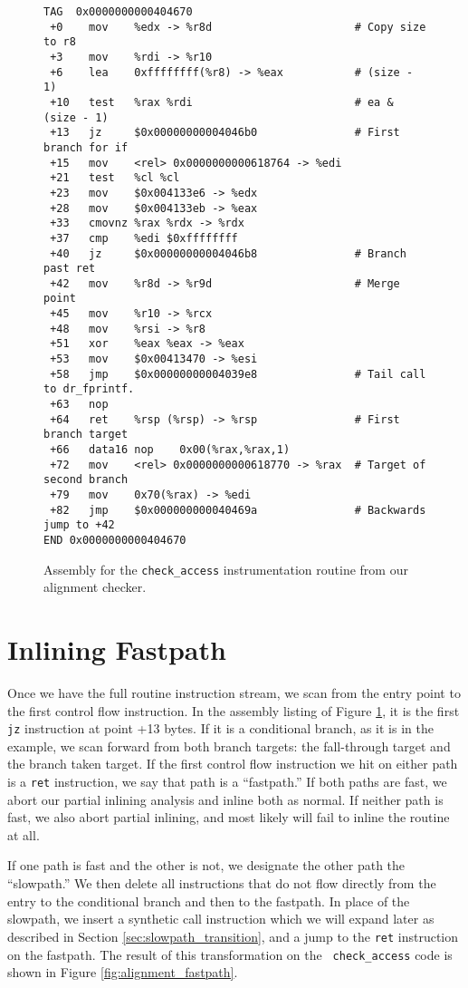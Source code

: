 \begin{figure}
\begin{verbatim}
TAG  0x0000000000404670
 +0    mov    %edx -> %r8d                      # Copy size to r8
 +3    mov    %rdi -> %r10
 +6    lea    0xffffffff(%r8) -> %eax           # (size - 1)
 +10   test   %rax %rdi                         # ea & (size - 1)
 +13   jz     $0x00000000004046b0               # First branch for if
 +15   mov    <rel> 0x0000000000618764 -> %edi
 +21   test   %cl %cl
 +23   mov    $0x004133e6 -> %edx
 +28   mov    $0x004133eb -> %eax
 +33   cmovnz %rax %rdx -> %rdx
 +37   cmp    %edi $0xffffffff
 +40   jz     $0x00000000004046b8               # Branch past ret
 +42   mov    %r8d -> %r9d                      # Merge point
 +45   mov    %r10 -> %rcx
 +48   mov    %rsi -> %r8
 +51   xor    %eax %eax -> %eax
 +53   mov    $0x00413470 -> %esi
 +58   jmp    $0x00000000004039e8               # Tail call to dr_fprintf.
 +63   nop
 +64   ret    %rsp (%rsp) -> %rsp               # First branch target
 +66   data16 nop    0x00(%rax,%rax,1)
 +72   mov    <rel> 0x0000000000618770 -> %rax  # Target of second branch
 +79   mov    0x70(%rax) -> %edi
 +82   jmp    $0x000000000040469a               # Backwards jump to +42
END 0x0000000000404670
\end{verbatim}
\caption{Assembly for the {\tt check\_access} instrumentation routine from our
alignment checker.}
\label{fig:alignment_asm}
\end{figure}

\section{Inlining Fastpath}

Once we have the full routine instruction stream, we scan from the entry point
to the first control flow instruction.  In the assembly listing of Figure
\ref{fig:alignment_asm}, it is the first {\tt jz} instruction at point +13
bytes.  If it is a conditional branch, as it is in the example, we scan forward
from both branch targets: the fall-through target and the branch taken target.
If the first control flow instruction we hit on either path is a {\tt ret}
instruction, we say that path is a ``fastpath.''  If both paths are fast, we
abort our partial inlining analysis and inline both as normal.  If neither path
is fast, we also abort partial inlining, and most likely will fail to inline the
routine at all.

If one path is fast and the other is not, we designate the other path the
``slowpath.''  We then delete all instructions that do not flow directly from
the entry to the conditional branch and then to the fastpath.  In place of the
slowpath, we insert a synthetic call instruction which we will expand later as
described in Section \ref{sec:slowpath_transition}, and a jump to the {\tt ret}
instruction on the fastpath.  The result of this transformation on the {\tt
check\_access} code is shown in Figure \ref{fig:alignment_fastpath}.

